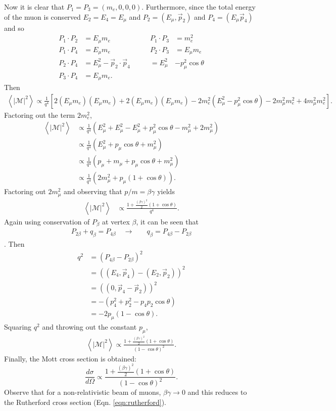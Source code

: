 Now it is clear that $P_1=P_3=(m_e, 0, 0, 0)$. Furthermore, since the total energy of the muon is conserved $E_2 = E_4 = E_\mu$ and $P_2 = (E_\mu, \vec{p}_2)$ and $P_4 = (E_\mu \vec{p}_4)$ and so
\begin{align*}
P_1 \cdot P_2 &= E_\mu m_e &\qquad P_1 \cdot P_3 &= m_e ^2 \\
P_1 \cdot P_4 &= E_\mu m_e &\qquad  P_2 \cdot P_3 &= E_\mu m_e \\
P_2 \cdot P_4 &= E_\mu ^2 - \vec{p}_2 \cdot \vec{p}_4 &\qquad = E_\mu ^2  & - p_\mu ^2 \cos\theta\\
P_3 \cdot P_4 &= E_\mu m_e.
\end{align*}
Then
\begin{align*}
\left< |\mathcal{M}|^2\right> \propto \frac{1}{q^4} [2 (E_\mu m_e)(E_\mu m_e) + 2 (E_\mu m_e) (E_\mu m_e) - 2 m_e ^2 (E_\mu^2 - p_\mu ^2 \cos\theta) - 2 m_\mu ^2 m_e ^2 + 4 m_\mu ^2 m_e ^2 ].
\end{align*}
Factoring out the term $2m_e ^2$, 
\begin{align*}
\left< |\mathcal{M}|^2\right> 
&\propto \frac{1}{q^4} (E_\mu ^2 + E_\mu ^2 - E_\mu ^2 + p_\mu ^2 \cos\theta - m_\mu ^2+ 2 m_\mu ^2 ) \\
&\propto \frac{1}{q^4} (E_\mu ^2 + p_\mu \cos\theta + m_\mu^2)\\
&\propto \frac{1}{q^4} (p_\mu + m_\mu + p_\mu \cos\theta + m_\mu^2)\\
&\propto \frac{1}{q^4} (2 m_\mu ^2 + p_\mu (1+\cos\theta)).
\end{align*}
Factoring out $2m_\mu ^2$ and observing that $p/m = \beta\gamma$ yields
\begin{align*}
\left< |\mathcal{M}|^2\right> 
&\propto \frac{1+\frac{(\beta\gamma)^2}{2} (1+\cos\theta)  }{q^4}.
\end{align*}
Again using conservation of $P_\beta$ at vertex $\beta$, it can be seen that 
\begin{align*}
P_{2\beta}+q_\beta=P_{4\beta} \quad \rightarrow \quad & q_\beta = P_{4\beta} - P_{2\beta}
\end{align*}.
Then
\begin{align*}
q^2 &= ( P_{4\beta} - P_{2\beta}) ^2\\
&= ( (E_4, \vec{p}_4) - (E_2, \vec{p}_2 ) )^2\\
& = ((0, \vec{p}_4 - \vec{p}_2))^2\\
& = - (p_4 ^2 + p_2 ^2 - p_4 p_2 \cos\theta)\\
&=-2p_\mu (1-\cos\theta).
\end{align*}
Squaring $q^2$ and throwing out the constant $p_\mu$,
\begin{align*}
\left< |\mathcal{M}|^2\right> \propto \frac{1+\frac{(\beta\gamma)^2}{2} (1+\cos\theta)  }{(1-\cos\theta)^2}.
\end{align*}
Finally, the Mott cross section is obtained:
\begin{equation}\label{eqn:MottCrossSection}
\frac{d\sigma}{d\Omega} \propto \frac{1+\frac{(\beta\gamma)^2}{2} (1+\cos\theta)  }{(1-\cos\theta)^2}.
\end{equation}
Observe that for a non-relativistic beam of muons, $\beta\gamma \rightarrow 0$ and this reduces to the Rutherford cross section (Eqn. \ref{eqn:rutherford}).

